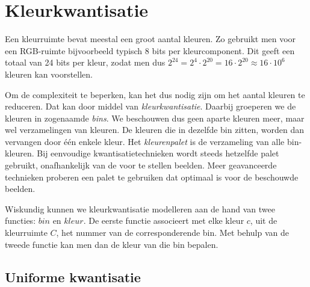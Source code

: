 \section{Kleurkwantisatie}
\label{sectie:kleurkwantisatie}

Een kleurruimte bevat meestal een groot aantal 
kleuren. Zo gebruikt men voor een RGB-ruimte bijvoorbeeld typisch 8 bits per 
kleurcomponent. Dit geeft een totaal van 24 bits per kleur, zodat men dus 
$2^{24}=2^4 \cdot 2^{20}=16 \cdot 2^{20} \approx 16 \cdot 10^6$ kleuren kan 
voorstellen.

Om de complexiteit te beperken, kan het dus nodig zijn om het aantal kleuren te 
reduceren. Dat kan door middel van \emph{kleurkwantisatie}. Daarbij groeperen we de kleuren in 
zogenaamde \emph{bins}. We beschouwen dus geen aparte kleuren meer, maar wel 
verzamelingen van kleuren. De kleuren die in dezelfde bin zitten, worden dan 
vervangen door \'e\'en enkele kleur. Het \emph{kleurenpalet} is de verzameling 
van alle bin-kleuren. Bij eenvoudige kwantisatietechnieken wordt steeds 
hetzelfde palet gebruikt, onafhankelijk van de voor te stellen beelden. Meer 
geavanceerde technieken proberen een palet te gebruiken dat optimaal is voor de 
beschouwde beelden.

Wiskundig kunnen we kleurkwantisatie modelleren aan de hand van twee functies: 
$bin$ en $kleur$. De eerste functie associeert met elke kleur $c$, uit de 
kleurruimte $C$, het nummer van de corresponderende bin. Met behulp van de 
tweede functie kan men dan de kleur van die bin bepalen.

\subsection{Uniforme kwantisatie}

